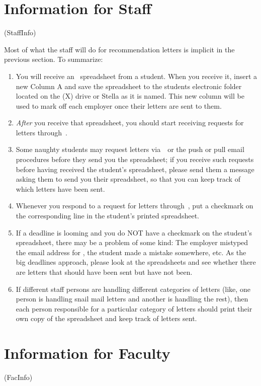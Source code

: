 \documentclass{econtex}
\begin{document}
\section{Information for Staff}\ifdvi\hypertarget{StaffInfo}{(StaffInfo)}\fi

Most of what the staff will do for recommendation letters is implicit in the previous section.  To
summarize:
\begin{enumerate}
\item You will receive an \EM~spreadsheet from a student.  When you receive it, insert a new Column A and save the spreadsheet to the students electronic folder located on the (X) drive or Stella as it is named. This new column will be used to mark off each employer once their letters are sent to them.
\item {\it After} you receive that spreadsheet, you should start receiving requests for letters through~\JMStaffEmail.  
\item Some naughty students may request letters via~\EJM~or the push or pull email procedures before they send you the spreadsheet; if you receive such requests before having received the student's spreadsheet, please send them a message asking them to send you their spreadsheet, so that you can keep track of which letters have been sent.
\item Whenever you respond to a request for letters through~\JMStaffEmail, put a checkmark on the corresponding line in the student's printed spreadsheet.
\item If a deadline is looming and you do NOT have a checkmark on the student's spreadsheet, there may be a problem of some kind: The employer mistyped the email address for \JMStaffEmail, the student made a mistake somewhere, etc.  As the big deadlines approach, please look at the spreadsheets and see whether there are letters that should have been sent but have not been.
\item If different staff persons are handling different categories of letters (like, one person is handling snail mail letters and another is handling the rest), then each person responsible for a particular category of letters should print their own copy of the spreadsheet and keep track of letters sent.
\end{enumerate}

\section{Information for Faculty}\ifdvi\hypertarget{FacInfo}{(FacInfo)}\fi
\end{document}
